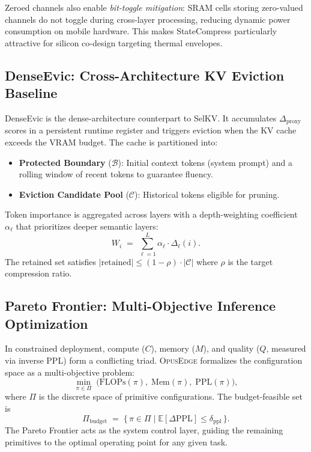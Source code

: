 \documentclass[11pt]{article}
\newcommand{\dsig}{\Delta}
\newcommand{\proxydsig}{\ensuremath{\dsig_{\mathrm{proxy}}}}
\newcommand{\opusedge}{\textsc{OpusEdge}}
\begin{document}
Zeroed channels also enable \emph{bit-toggle mitigation}: SRAM cells storing
zero-valued channels do not toggle during cross-layer processing, reducing
dynamic power consumption on mobile hardware. This makes StateCompress
particularly attractive for silicon co-design targeting thermal envelopes.

\subsection{DenseEvic: Cross-Architecture KV Eviction Baseline}
DenseEvic is the dense-architecture counterpart to SelKV. It accumulates
$\proxydsig$ scores in a persistent runtime register and triggers eviction
when the KV cache exceeds the VRAM budget. The cache is partitioned into:
\begin{itemize}[leftmargin=1.4em,itemsep=1pt,topsep=1pt]
  \item \textbf{Protected Boundary} ($\mathcal{B}$): Initial context tokens
    (system prompt) and a rolling window of recent tokens to guarantee fluency.
  \item \textbf{Eviction Candidate Pool} ($\mathcal{C}$): Historical tokens
    eligible for pruning.
\end{itemize}
Token importance is aggregated across layers with a depth-weighting
coefficient $\alpha_\ell$ that prioritizes deeper semantic layers:
\begin{equation}\label{eq:denseevic}
  W_i \;=\; \sum_{\ell=1}^{L} \alpha_\ell \cdot \dsig_\ell(i).
\end{equation}
The retained set satisfies $|\mathrm{retained}| \le (1-\rho) \cdot |\mathcal{C}|$
where $\rho$ is the target compression ratio.

\subsection{Pareto Frontier: Multi-Objective Inference Optimization}
In constrained deployment, compute ($C$), memory ($M$), and quality ($Q$,
measured via inverse PPL) form a conflicting triad. \opusedge{} formalizes
the configuration space as a multi-objective problem:
\begin{equation}\label{eq:pareto}
  \min_{\pi \in \Pi} \;\bigl(\mathrm{FLOPs}(\pi),\; \mathrm{Mem}(\pi),\; \mathrm{PPL}(\pi)\bigr),
\end{equation}
where $\Pi$ is the discrete space of primitive configurations. The
budget-feasible set is
\begin{equation}\label{eq:pareto_budget}
  \Pi_{\mathrm{budget}} \;=\; \bigl\{\, \pi \in \Pi \;\big|\; \mathbb{E}[\Delta\mathrm{PPL}] \le \delta_{\mathrm{ppl}} \,\bigr\}.
\end{equation}
The Pareto Frontier acts as the system control layer, guiding the remaining
primitives to the optimal operating point for any given task.
\end{document}
